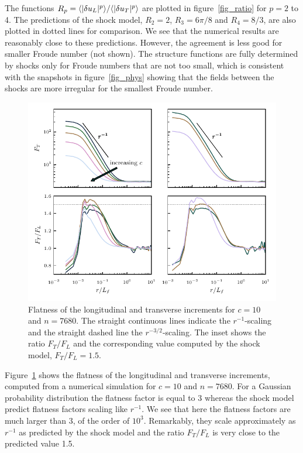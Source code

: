 The functions $R_p = \langle |\delta u_L|^p \rangle/\langle |\delta u_T|^p \rangle$ are
plotted in figure~\ref{fig_ratio} for $p =2$ to 4.  The predictions of
the shock model, $R_2 = 2$, $R_3 = 6\pi/8$ and $R_4 = 8/3$, are also
plotted in dotted lines for comparison.  We see that the numerical
results are reasonably close to these predictions.  However, the
agreement is less good for smaller Froude number (not shown).  The
structure functions are fully determined by shocks only for Froude
numbers that are not too small, which is consistent with the snapshots
in figure~\ref{fig_phys} showing that the fields between the shocks
are more irregular for the smallest Froude number.


\begin{figure}
\centerline{\includegraphics[width=\halfwidth]{../Pyfig/fig_flatness}}
\caption{ Flatness of the longitudinal and transverse increments for
$c = 10$ and $n = 7680$. The straight continuous lines indicate the
$r^{-1}$-scaling and the straight dashed line the $r^{-3/2}$-scaling.
The inset shows the ratio $F_T/F_L$ and the corresponding value
computed by the shock model, $F_T/F_L = 1.5$.  }
\label{fig_flatness}
\end{figure}
%
Figure~\ref{fig_flatness} shows the flatness of the longitudinal and
transverse increments, computed from a numerical simulation for $c =
10$ and $n = 7680$.
%
For a Gaussian probability distribution the flatness factor is equal
to 3 whereas the shock model predict flatness factors scaling like
$r^{-1}$.
%
We see that here the flatness factors are much larger than 3, of the
order of $10^3$.
%
Remarkably, they scale approximately as $r^{-1}$ as predicted by the
shock model and the ratio $F_T/F_L$ is very close to the predicted
value 1.5.



